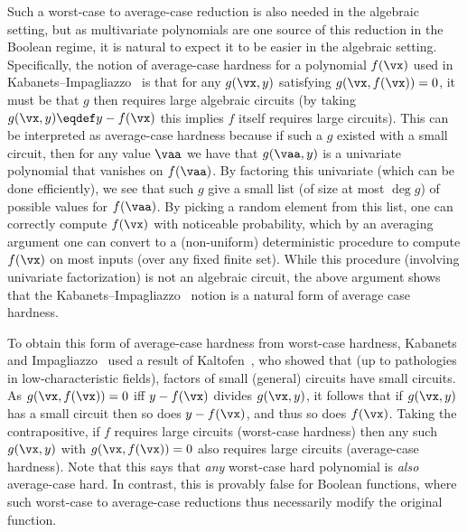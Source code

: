 \documentclass[11pt]{article}
\numberwithin{equation}{section}
\theoremstyle{definition}
\theoremstyle{plain}
\begin{document}
Such a worst-case to average-case reduction is also needed in the algebraic setting, but as multivariate polynomials are one source of this reduction in the Boolean regime, it is natural to expect it to be easier in the algebraic setting. Specifically, the notion of average-case hardness for a polynomial $f(\vx)$ used in Kabanets--Impagliazzo~\cite{KabanetsImpagliazzo04} is that for any $g(\vx,y)$ satisfying $g(\vx,f(\vx))=0$, it must be that $g$ then requires large algebraic circuits (by taking $g(\vx,y)\eqdef y-f(\vx)$ this implies $f$ itself requires large circuits).  This can be interpreted as average-case hardness because if such a $g$ existed with a small circuit, then for any value $\vaa$ we have that $g(\vaa,y)$ is a univariate polynomial that vanishes on $f(\vaa)$. By factoring this univariate (which can be done efficiently), we see that such $g$ give a small list (of size at most $\deg g$) of possible values for $f(\vaa)$. By picking a random element from this list, one can correctly compute $f(\vx)$ with noticeable probability, which by an averaging argument one can convert to a (non-uniform) deterministic procedure to compute $f(\vx)$ on most inputs (over any fixed finite set).  While this procedure (involving univariate factorization) is not an algebraic circuit, the above argument shows that the Kabanets--Impagliazzo~\cite{KabanetsImpagliazzo04} notion is a natural form of average case hardness.

To obtain this form of average-case hardness from worst-case hardness, Kabanets and Impagliazzo~\cite{KabanetsImpagliazzo04} used a result of Kaltofen~\cite{Kaltofen89}, who showed that (up to pathologies in low-characteristic fields), factors of small (general) circuits have small circuits.  As $g(\vx,f(\vx))=0$ iff $y-f(\vx)$ divides $g(\vx,y)$, it follows that if $g(\vx,y)$ has a small circuit then so does $y-f(\vx)$, and thus so does $f(\vx)$.  Taking the contrapositive, if $f$ requires large circuits (worst-case hardness) then any such $g(\vx,y)$ with $g(\vx,f(\vx))=0$ also requires large circuits (average-case hardness). Note that this says that \emph{any} worst-case hard polynomial is \emph{also} average-case hard.  In contrast, this is provably false for Boolean functions, where such worst-case to average-case reductions thus necessarily modify the original function.
\end{document}
